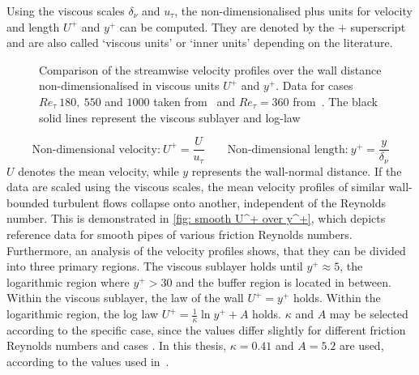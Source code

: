 Using the viscous scales $\delta_\nu$ and $u_\tau$, the non-dimensionalised plus units for velocity and length $U^+$ and $y^+$ can be computed.
They are denoted by the $+$ superscript and are also called `viscous units' or `inner units' depending on the literature.
\begin{figure}
    \centering
    
    \caption[Mean velocity profiles $U^+$ over $y^+$ of smooth pipes from reference data]{Comparison of the streamwise velocity profiles over the wall distance non-dimensionalised in viscous units $U^+$ and $y^+$. Data for cases $Re_\tau \ 180,\ 550$ and $1000$ taken from~\cite{yaoDirectNumericalSimulations2023} and $Re_\tau = 360$ from~\cite{elkhouryDirectNumericalSimulation2013}. The black solid lines represent the viscous sublayer and log-law}
    \label{fig: smooth U^+ over y^+}
\end{figure}
\begin{equation}
    \text{Non-dimensional velocity:}\ U^+ = \frac{U}{u_\tau} \qquad \text{Non-dimensional length:}\ y^+ = \frac{y}{\delta_\nu}
\end{equation}
$U$ denotes the mean velocity, while $y$ represents the wall-normal distance.
If the data are scaled using the viscous scales, the mean velocity profiles of similar wall-bounded turbulent flows collapse onto another, independent of the Reynolds number.
This is demonstrated in \autoref{fig: smooth U^+ over y^+}, which depicts reference data for smooth pipes of various friction Reynolds numbers.
Furthermore, an analysis of the velocity profiles shows, that they can be divided into three primary regions.
The viscous sublayer holds until $y^+ \approx 5$, the logarithmic region where $y^+ > 30$ and the buffer region is located in between.
Within the viscous sublayer, the law of the wall $U^+ = y^+$ holds. 
Within the logarithmic region, the log law $U^+ = \frac{1}{\kappa}\ln{y^+} + A$ holds.
$\kappa$ and $A$ may be selected according to the specific case, since the values differ slightly for different friction Reynolds numbers and cases \citep{popeTurbulentFlows2015}.
In this thesis, $\kappa = 0.41$ and $A = 5.2$ are used, according to the values used in~\cite{popeTurbulentFlows2015}.


